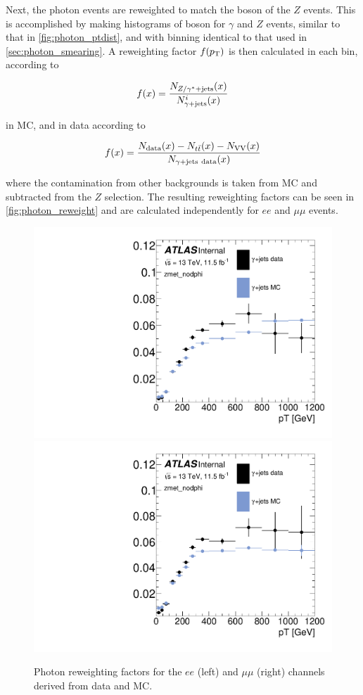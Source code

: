 Next, the photon events are reweighted to match the boson \pt of the $Z$ events. This is accomplished by making histograms of boson \pt for $\gamma$ and $Z$ events, similar to that in \autoref{fig:photon_ptdist}, and with binning identical to that used in \autoref{sec:photon_smearing}. A reweighting factor $f(p_{\text{T}})$ is then calculated in each bin, according to

\begin{equation}
f(x) = \frac{N_{Z/\gamma^{*}+\text{jets}}(x)}{N_{\gamma+\text{jets}}^{i}(x)}
\end{equation}

in \ac{MC}, and in data according to

\begin{equation}
f(x) = \frac{N_{\text{data}}(x)-N_{t\bar{t}}(x)-N_{\text{VV}}(x)}{N_{\gjets\ \text{data}}(x)}
\end{equation}

where the contamination from other backgrounds is taken from \ac{MC} and subtracted from the $Z$ selection. The resulting reweighting factors can be seen in \autoref{fig:photon_reweight} and are calculated independently for $ee$ and $\mu\mu$ events.

\begin{centering}
\begin{figure}[!hbt]
\myfloatalign
\includegraphics[width=.45\linewidth]{figures/photons/Corr_hist_ptrw_ee_2j_2016_mcmetl_ptsmrw_smear_zmet_nodphi_.pdf}
\includegraphics[width=.45\linewidth]{figures/photons/Corr_hist_ptrw_mm_2j_2016_mcmetl_ptsmrw_smear_zmet_nodphi_.pdf}
\caption{Photon reweighting factors for the $ee$ (left) and $\mu\mu$ (right) channels derived from data and \ac{MC}.}
\label{fig:photon_reweight}
\end{figure}
\end{centering}

